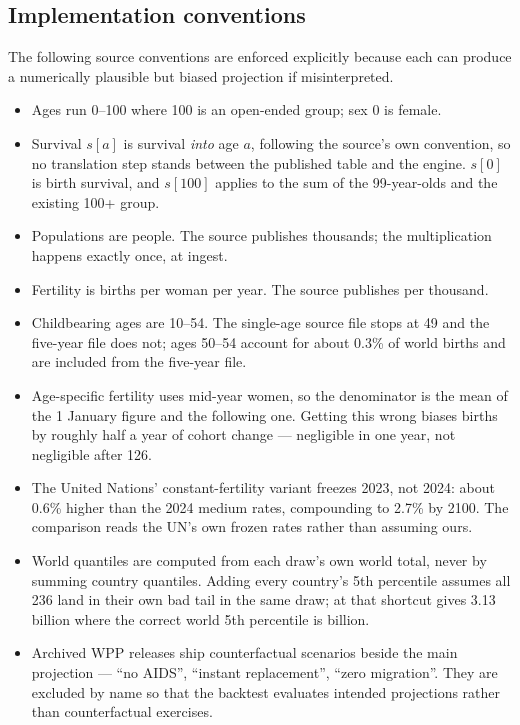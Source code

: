 \subsection{Implementation conventions}
\label{app:conventions}

The following source conventions are enforced explicitly because each can
produce a numerically plausible but biased projection if misinterpreted.

\begin{itemize}[leftmargin=1.2em]
\item Ages run 0--100 where 100 is an open-ended group; sex 0 is female.
\item Survival $s[a]$ is survival \emph{into} age $a$, following the source's own
convention, so no translation step stands between the published table and the
engine. $s[0]$ is birth survival, and $s[100]$ applies to the sum of the
99-year-olds and the existing 100+ group.
\item Populations are people. The source publishes thousands; the multiplication
happens exactly once, at ingest.
\item Fertility is births per woman per year. The source publishes per thousand.
\item Childbearing ages are 10--54. The single-age source file stops at 49 and
the five-year file does not; ages 50--54 account for about 0.3\% of world births
and are included from the five-year file.
\item Age-specific fertility uses mid-year women, so the denominator is the mean
of the 1 January figure and the following one. Getting this wrong biases births
by roughly half a year of cohort change --- negligible in one year, not
negligible after 126.
\item The United Nations' constant-fertility variant freezes 2023, not 2024:
about 0.6\% higher than the 2024 medium rates, compounding to 2.7\% by 2100. The
comparison reads the UN's own frozen rates rather than assuming ours.
\item World quantiles are computed from each draw's own world total, never by
summing country quantiles. Adding every country's 5th percentile assumes all 236
land in their own bad tail in the same draw; at \ProjectionEndYear{} that
shortcut gives 3.13 billion where the correct world 5th percentile is
\ComparatorTwentyOneFiftyLow{} billion.
\item Archived WPP releases ship counterfactual scenarios beside the main
projection --- ``no AIDS'', ``instant replacement'', ``zero migration''. They are
excluded by name so that the backtest evaluates intended projections rather than
counterfactual exercises.
\end{itemize}

